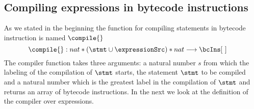 

\subsection{Compiling expressions in bytecode instructions} \label{pogEq:compile:compExpr}

As we stated in the beginning the function for compiling statements in bytecode instruction is named $\compile{}$
$$ \compile{ } : nat * (\stmt \cup \expressionSrc )* nat \longrightarrow  \bcIns [ \ ]  $$
The compiler function takes three arguments: a natural number $s$ from which the labeling of the compilation of $\stmt$ starts,
 the statement $\stmt$ to be compiled and a natural number which is the greatest label in the compilation of  $\stmt$ 
and returns an array of bytecode instructions.
In the next we look at the definition of the compiler over expressions.
 

